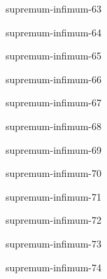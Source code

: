 \begin{defproblem}{supremum-infimum-63}

\end{defproblem}

\begin{defproblem}{supremum-infimum-64}

\end{defproblem}

\begin{defproblem}{supremum-infimum-65}

\end{defproblem}

\begin{defproblem}{supremum-infimum-66}

\end{defproblem}

\begin{defproblem}{supremum-infimum-67}

\end{defproblem}

\begin{defproblem}{supremum-infimum-68}

\end{defproblem}

\begin{defproblem}{supremum-infimum-69}

\end{defproblem}

\begin{defproblem}{supremum-infimum-70}

\end{defproblem}

\begin{defproblem}{supremum-infimum-71}

\end{defproblem}

\begin{defproblem}{supremum-infimum-72}

\end{defproblem}

\begin{defproblem}{supremum-infimum-73}

\end{defproblem}

\begin{defproblem}{supremum-infimum-74}

\end{defproblem}